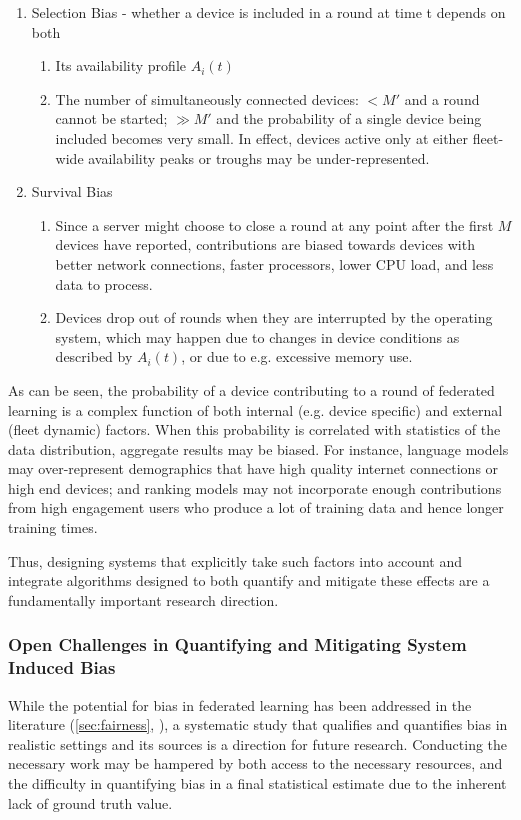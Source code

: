 \documentclass[11pt]{article}
\begin{document}
\begin{enumerate}
    \item Selection Bias - whether a device is included in a round at time t depends on both
    \begin{enumerate}
        \item Its availability profile $A_i(t)$
        \item The number of simultaneously connected devices: $<M'$ and a round cannot be started; $\gg M'$ and the probability of a single device being included becomes very small. In effect, devices active only at either fleet-wide availability peaks or troughs may be under-represented.
    \end{enumerate}
    \item Survival Bias
    \begin{enumerate}
        \item Since a server might choose to close a round at any point after the first $M$ devices have reported, contributions are biased towards devices with better network connections, faster processors, lower CPU load, and less data to process.
        \item Devices drop out of rounds when they are interrupted by the operating system, which may happen due to changes in device conditions as described by $A_i (t)$, or due to e.g. excessive memory use.
    \end{enumerate}
\end{enumerate}

As can be seen, the probability of a device contributing to a round of federated learning is a complex function of both internal (e.g. device specific) and external (fleet dynamic) factors. When this probability is correlated with statistics of the data distribution, aggregate results may be biased. For instance, language models may over-represent demographics that have high quality internet connections or high end devices; and ranking models may not incorporate enough contributions from high engagement users who produce a lot of training data and hence longer training times.

Thus, designing systems that explicitly take such factors into account and integrate algorithms designed to both quantify and mitigate these effects are a fundamentally important research direction.

\subsubsection{Open Challenges in Quantifying and Mitigating System Induced Bias}
While the potential for bias in federated learning has been addressed in the literature (\cref{sec:fairness}, \citep{bonawitz19sysml, li2019fair, eichner19semicyclic}), a systematic study that qualifies and quantifies bias in realistic settings and its sources is a direction for future research. Conducting the necessary work may be hampered by both access to the necessary resources, and the difficulty in quantifying bias in a final statistical estimate due to the inherent lack of ground truth value.
\end{document}
